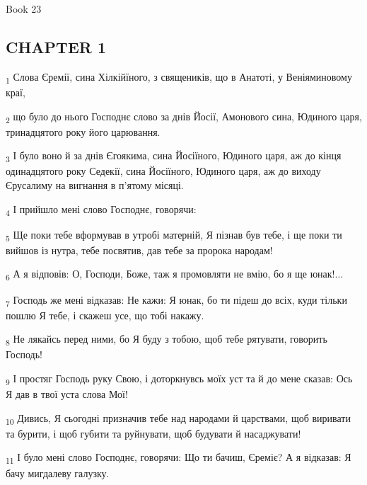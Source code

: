 Book 23
\subsection{CHAPTER 1}
\begin{tcolorbox}
\textsubscript{1} Слова Єремії, сина Хілкійїного, з священиків, що в Анатоті, у Веніяминовому краї,
\end{tcolorbox}
\begin{tcolorbox}
\textsubscript{2} що було до нього Господнє слово за днів Йосії, Амонового сина, Юдиного царя, тринадцятого року його царювання.
\end{tcolorbox}
\begin{tcolorbox}
\textsubscript{3} І було воно й за днів Єгоякима, сина Йосіїного, Юдиного царя, аж до кінця одинадцятого року Седекії, сина Йосіїного, Юдиного царя, аж до виходу Єрусалиму на вигнання в п'ятому місяці.
\end{tcolorbox}
\begin{tcolorbox}
\textsubscript{4} І прийшло мені слово Господнє, говорячи:
\end{tcolorbox}
\begin{tcolorbox}
\textsubscript{5} Ще поки тебе вформував в утробі матерній, Я пізнав був тебе, і ще поки ти вийшов із нутра, тебе посвятив, дав тебе за пророка народам!
\end{tcolorbox}
\begin{tcolorbox}
\textsubscript{6} А я відповів: О, Господи, Боже, таж я промовляти не вмію, бо я ще юнак!...
\end{tcolorbox}
\begin{tcolorbox}
\textsubscript{7} Господь же мені відказав: Не кажи: Я юнак, бо ти підеш до всіх, куди тільки пошлю Я тебе, і скажеш усе, що тобі накажу.
\end{tcolorbox}
\begin{tcolorbox}
\textsubscript{8} Не лякайсь перед ними, бо Я буду з тобою, щоб тебе рятувати, говорить Господь!
\end{tcolorbox}
\begin{tcolorbox}
\textsubscript{9} І простяг Господь руку Свою, і доторкнувсь моїх уст та й до мене сказав: Ось Я дав в твої уста слова Мої!
\end{tcolorbox}
\begin{tcolorbox}
\textsubscript{10} Дивись, Я сьогодні призначив тебе над народами й царствами, щоб виривати та бурити, і щоб губити та руйнувати, щоб будувати й насаджувати!
\end{tcolorbox}
\begin{tcolorbox}
\textsubscript{11} І було мені слово Господнє, говорячи: Що ти бачиш, Єреміє? А я відказав: Я бачу мигдалеву галузку.
\end{tcolorbox}
